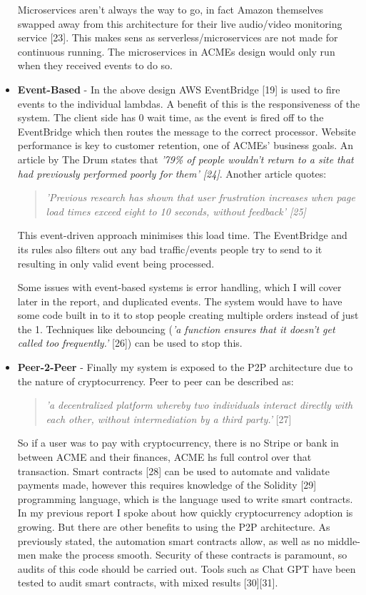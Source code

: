 \begin{itemize}
    Microservices aren't always the way to go, in fact Amazon themselves swapped away from this architecture for their live audio/video monitoring service [23].
    This makes sens as serverless/microservices are not made for continuous running. The microservices in ACMEs design would only run when they received events
    to do so.

    \item \textbf{Event-Based} - In the above design AWS EventBridge [19] is used to fire events to the individual lambdas. A benefit of this is the 
    responsiveness of the system. The client side has 0 wait time, as the event is fired off to the EventBridge which then routes the message to the correct 
    processor. Website performance is key to customer retention, one of ACMEs' business goals. An article by The Drum states that \textit{'79\% of people 
    wouldn't return to a site that had previously performed poorly for them' [24]}. Another article quotes:
    \begin{quote}
      \textit{'Previous research has shown that user frustration increases when page load times exceed eight to 10 seconds, without feedback' [25]}
    \end{quote}
    This event-driven approach minimises this load time. The EventBridge and its rules also filters out any bad traffic/events people try to send to it
    resulting in only valid event being processed.

    Some issues with event-based systems is error handling, which I will cover later in the report, and duplicated events. The system would have to have 
    some code built in to it to stop people creating multiple orders instead of just the 1. Techniques like debouncing (\textit {'a function ensures that 
    it doesn't get called too frequently.'} [26]) can be used to stop this. 

    \item \textbf{Peer-2-Peer} - Finally my system is exposed to the P2P architecture due to the nature of cryptocurrency. Peer to peer can be described as:
    \begin{quote}
      \textit{'a decentralized platform whereby two individuals interact directly with each other, without intermediation 
      by a third party.'} [27]
    \end{quote}

    So if a user was to pay with cryptocurrency, there is no Stripe or bank in between ACME and their finances, ACME hs full control over that transaction.
    Smart contracts [28] can be used to automate and validate payments made, however this requires knowledge of the Solidity [29] programming language, which 
    is the language used to write smart contracts. In my previous report I spoke about how quickly cryptocurrency adoption is growing. But there are other 
    benefits to using the P2P architecture. As previously stated, the automation smart contracts allow, as well as no middle-men make the process smooth.
    Security of these contracts is paramount, so audits of this code should be carried out. Tools such as Chat GPT have been tested to audit 
    smart contracts, with mixed results [30][31].

  \end{itemize}

\newpage